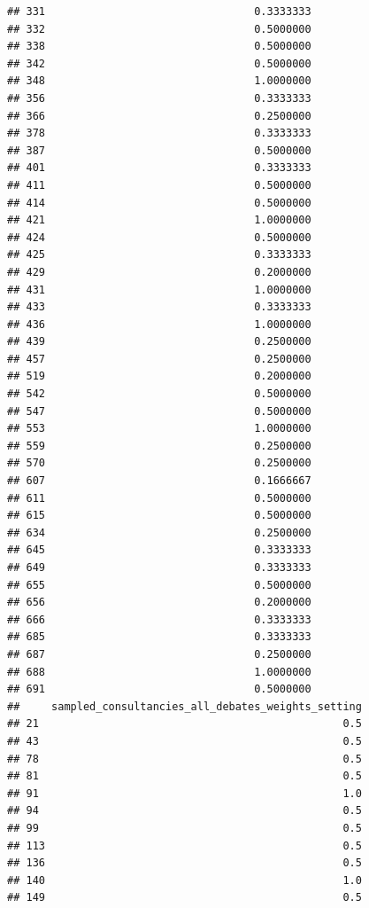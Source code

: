 \documentclass[
]{article}
\begin{document}
\begin{verbatim}
## 331                                 0.3333333
## 332                                 0.5000000
## 338                                 0.5000000
## 342                                 0.5000000
## 348                                 1.0000000
## 356                                 0.3333333
## 366                                 0.2500000
## 378                                 0.3333333
## 387                                 0.5000000
## 401                                 0.3333333
## 411                                 0.5000000
## 414                                 0.5000000
## 421                                 1.0000000
## 424                                 0.5000000
## 425                                 0.3333333
## 429                                 0.2000000
## 431                                 1.0000000
## 433                                 0.3333333
## 436                                 1.0000000
## 439                                 0.2500000
## 457                                 0.2500000
## 519                                 0.2000000
## 542                                 0.5000000
## 547                                 0.5000000
## 553                                 1.0000000
## 559                                 0.2500000
## 570                                 0.2500000
## 607                                 0.1666667
## 611                                 0.5000000
## 615                                 0.5000000
## 634                                 0.2500000
## 645                                 0.3333333
## 649                                 0.3333333
## 655                                 0.5000000
## 656                                 0.2000000
## 666                                 0.3333333
## 685                                 0.3333333
## 687                                 0.2500000
## 688                                 1.0000000
## 691                                 0.5000000
##     sampled_consultancies_all_debates_weights_setting
## 21                                                0.5
## 43                                                0.5
## 78                                                0.5
## 81                                                0.5
## 91                                                1.0
## 94                                                0.5
## 99                                                0.5
## 113                                               0.5
## 136                                               0.5
## 140                                               1.0
## 149                                               0.5

\end{verbatim}
\end{document}
